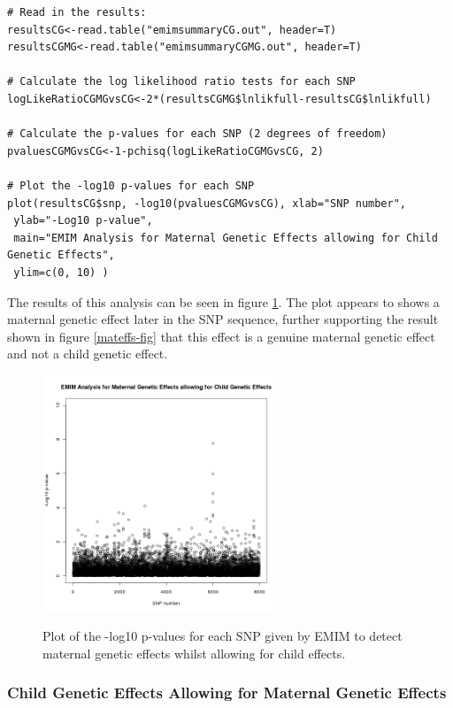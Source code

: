 \documentclass[a4paper,12pt]{article}
\begin{document}
\begin{enumerate}
\begin{lstlisting}
# Read in the results:
resultsCG<-read.table("emimsummaryCG.out", header=T)
resultsCGMG<-read.table("emimsummaryCGMG.out", header=T)

# Calculate the log likelihood ratio tests for each SNP
logLikeRatioCGMGvsCG<-2*(resultsCGMG$lnlikfull-resultsCG$lnlikfull)

# Calculate the p-values for each SNP (2 degrees of freedom)
pvaluesCGMGvsCG<-1-pchisq(logLikeRatioCGMGvsCG, 2)

# Plot the -log10 p-values for each SNP
plot(resultsCG$snp, -log10(pvaluesCGMGvsCG), xlab="SNP number",
 ylab="-Log10 p-value",
 main="EMIM Analysis for Maternal Genetic Effects allowing for Child Genetic Effects",
 ylim=c(0, 10) )

\end{lstlisting} \vspace{0.35cm}The results of this analysis can be seen in figure  \ref{matnotchildeffs-fig}. The plot appears to shows a maternal genetic effect later in the SNP sequence, further supporting the result shown in figure  \ref{mateffs-fig} that this effect is a genuine maternal genetic effect and not a child genetic effect.\end{enumerate}
{\begin{figure}[ht]
{\begin{center}
{\includegraphics[width=200pt]{plotMaternalwoChildEffects.png}}
\caption{Plot of the -log10 p-values for each SNP given by EMIM to detect maternal genetic effects whilst allowing for child effects.}
\label{matnotchildeffs-fig}
\end{center}}
\end{figure}
}


\subsubsection{Child Genetic Effects Allowing for Maternal Genetic Effects}
\label{eg-child-wo-maternal}
\end{document}
